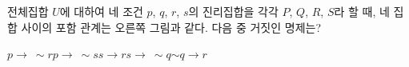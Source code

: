 \noindent\begin{minipage}[t]{0.58\linewidth}\vspace{0pt}\raggedright 전체집합 $U$에 대하여 네 조건 $p$, $q$, $r$, $s$의 진리집합을 각각 $P$, $Q$, $R$, $S$라 할 때, 네 집합 사이의 포함 관계는 오른쪽 그림과 같다. 다음 중 거짓인 명제는?\end{minipage}\hfill\begin{minipage}[t]{0.4\linewidth}\vspace{0pt}\centering \resizebox{\ifdim\width>\linewidth\linewidth\else\width\fi}{!}{}\end{minipage}\par
\begin{choices32}{$p\longrightarrow\ \sim r$}{$p\longrightarrow\ \sim s$}{$s\longrightarrow r$}{$s\longrightarrow\ \sim q$}{$\sim q\longrightarrow r$}\end{choices32}
